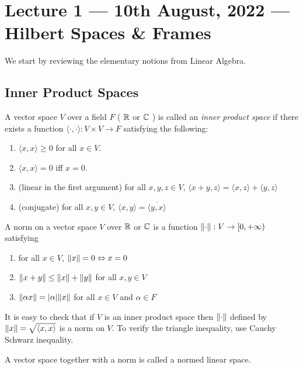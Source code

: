 \section{Lecture 1 --- 10th August, 2022 --- Hilbert Spaces \& Frames}
We start by reviewing the elementary notions from Linear Algebra.
\subsection{Inner Product Spaces}
\begin{definition}
    A vector space $V$ over a field $F$ ( $\mathbb R$ or $\mathbb C$ ) is called an \textit{inner product space} if there exists a function $\langle \cdot , \cdot \rangle : V \times V \to F$ satisfying the following:
    \begin{enumerate}
	\item $\langle x , x \rangle \ge 0$ for all $x\in V$.
	\item $\langle x , x \rangle =0$ iff $x=0$.
	\item (linear in the first argument) for all $x,y,z \in V$, $\langle x+y , z\rangle = \langle x , z \rangle + \langle y , z \rangle$
	\item (conjugate) for all $x,y \in V$, $\langle x , y \rangle = \overline{\langle y , x \rangle}$
    \end{enumerate}
    \label{def:ips}
\end{definition}

\begin{definition}
    A norm on a vector space $V$ over $\mathbb R$ or $\mathbb C$ is a function $\lVert \cdot \rVert : V \to [0, +\infty)$ satisfying
    \begin{enumerate}
	\item for all $x\in V$, $\lVert x \rVert = 0 \Leftrightarrow x=0$
	\item $\lVert x+y \rVert \le \lVert x \rVert + \lVert y \rVert$ for all $x,y\in V$
	\item $\lVert \alpha x \rVert =|\alpha| \lVert x \rVert$ for all $x \in V$ and $\alpha \in F$
	\end{enumerate}
    \label{def:norm}
\end{definition}

It is easy to check that if $V$ is an inner product space then $\lVert \cdot \rVert$ defined by $\lVert x \rVert=\sqrt{\langle x, x \rangle}$ is a norm on $V$. To verify the triangle inequality, use Cauchy Schwarz inequality.

\begin{definition}
    A vector space together with a norm is called a normed linear space.
    \label{def:normed-space}
\end{definition}


